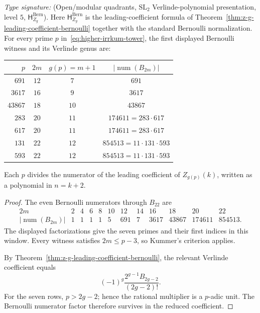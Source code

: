 \begin{theorem}
\ClaimStatusProvedHere
\label{thm:higher-kummer-z-g-presence}
\emph{Type signature:}
\textup{(Open/modular quadrants, \(\mathrm{SL}_2\) Verlinde-polynomial
presentation, level \(5\),
\(\mathsf H_{Z_g}^{\mathrm{Bern}}\)).}
Here \(\mathsf H_{Z_g}^{\mathrm{Bern}}\) is the leading-coefficient
formula of Theorem~\ref{thm:z-g-leading-coefficient-bernoulli}
together with the standard Bernoulli normalization.
For every prime \(p\) in~\eqref{eq:higher-irrkum-tower}, the first
displayed Bernoulli witness and its Verlinde genus are:
\begin{center}
\begin{tabular}{rccc}
\hline
\(p\)&\(2m\)&\(g(p)=m+1\)&\(\lvert\operatorname{num}(B_{2m})\rvert\)\\
\hline
\(691\)&\(12\)&\(7\)&\(691\)\\
\(3617\)&\(16\)&\(9\)&\(3617\)\\
\(43867\)&\(18\)&\(10\)&\(43867\)\\
\(283\)&\(20\)&\(11\)&\(174611=283\cdot617\)\\
\(617\)&\(20\)&\(11\)&\(174611=283\cdot617\)\\
\(131\)&\(22\)&\(12\)&\(854513=11\cdot131\cdot593\)\\
\(593\)&\(22\)&\(12\)&\(854513=11\cdot131\cdot593\)\\
\hline
\end{tabular}
\end{center}
Each \(p\) divides the numerator of the leading coefficient of
\(Z_{g(p)}(k)\), written as a polynomial in \(n=k+2\).
\end{theorem}

\begin{proof}
The even Bernoulli numerators through \(B_{22}\) are
\[
\begin{array}{c|ccccccccccc}
2m&2&4&6&8&10&12&14&16&18&20&22\\ \hline
\lvert\operatorname{num}(B_{2m})\rvert
&1&1&1&1&5&691&7&3617&43867&174611&854513.
\end{array}
\]
The displayed factorizations give the seven primes and their first
indices in this window.  Every witness satisfies \(2m\le p-3\), so
Kummer's criterion applies.

By Theorem~\ref{thm:z-g-leading-coefficient-bernoulli}, the relevant
Verlinde coefficient equals
\[
 (-1)^g\frac{2^{g-1}B_{2g-2}}{(2g-2)!}.
\]
For the seven rows, \(p>2g-2\); hence the rational multiplier is a
\(p\)-adic unit.  The Bernoulli numerator factor therefore survives
in the reduced coefficient.
\end{proof}

